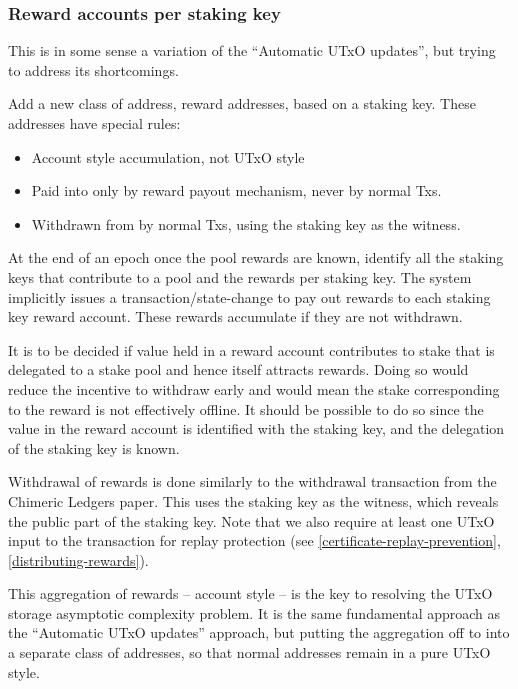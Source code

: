 \documentclass[11pt,a4paper,dvipsnames,twosided]{article}
\begin{document}
\subsubsection{Reward accounts per staking key}
\label{reward-accounts-per-stake-key}

This is in some sense a variation of the ``Automatic UTxO updates'', but
trying to address its shortcomings.

Add a new class of address, reward addresses, based on a staking key.
These addresses have special rules:

\begin{itemize}
\item
  Account style accumulation, not UTxO style
\item
  Paid into only by reward payout mechanism, never by normal Txs.
\item
  Withdrawn from by normal Txs, using the staking key as the witness.
\end{itemize}

At the end of an epoch once the pool rewards are known, identify all the
staking keys that contribute to a pool and the rewards per staking key. The
system implicitly issues a transaction/state-change to pay out rewards
to each staking key reward account. These rewards accumulate if they are
not withdrawn.

It is to be decided if value held in a reward account contributes to
stake that is delegated to a stake pool and hence itself attracts
rewards. Doing so would reduce the incentive to withdraw early and would
mean the stake corresponding to the reward is not effectively offline.
It should be possible to do so since the value in the reward account is
identified with the staking key, and the delegation of the staking key is
known.

Withdrawal of rewards is done similarly to the withdrawal transaction from the
Chimeric Ledgers paper. This uses the staking key as the witness, which reveals
the public part of the staking key. Note that we also require at least one UTxO
input to the transaction for replay protection (see
\cref{certificate-replay-prevention}, \cref{distributing-rewards}).

This aggregation of rewards -- account style -- is the key to resolving
the UTxO storage asymptotic complexity problem. It is the same
fundamental approach as the ``Automatic UTxO updates'' approach, but
putting the aggregation off to into a separate class of addresses, so
that normal addresses remain in a pure UTxO style.
\end{document}
